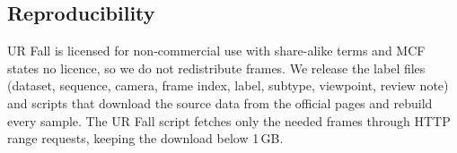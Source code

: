 \begin{table}[t]
\centering
\caption{Benchmark composition after visual review.}
\label{tab:benchmark}
\footnotesize
\setlength{\tabcolsep}{2.4pt}

\end{table}

\subsection{Reproducibility}
UR Fall is licensed for non-commercial use with share-alike terms and MCF states no licence, so we do not redistribute frames. We release the label files (dataset, sequence, camera, frame index, label, subtype, viewpoint, review note) and scripts that download the source data from the official pages and rebuild every sample. The UR Fall script fetches only the needed frames through HTTP range requests, keeping the download below 1\,GB.
